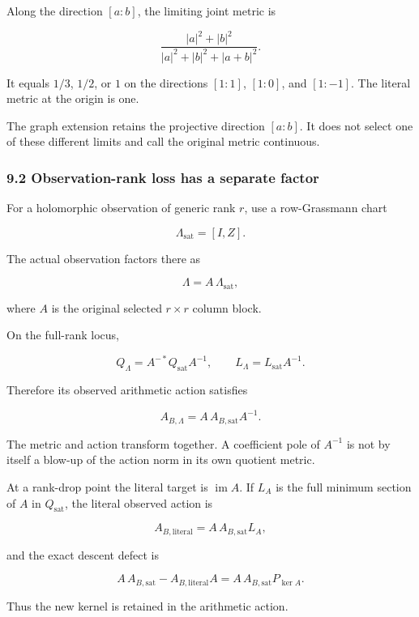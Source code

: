 \documentclass[11pt]{article}
\begin{document}
Along the direction \([a:b]\), the limiting joint metric is

\[
\boxed{
\frac{|a|^2+|b|^2}
{|a|^2+|b|^2+|a+b|^2}.
}
\tag{76}
\]

It equals \(1/3\), \(1/2\), or \(1\) on the directions \([1:1]\), \([1:0]\), and \([1:-1]\). The literal metric at the origin is one.

The graph extension retains the projective direction \([a:b]\). It does not select one of these different limits and call the original metric continuous.

\subsubsection{9.2 Observation-rank loss has a separate factor}\label{observation-rank-loss-has-a-separate-factor}

For a holomorphic observation of generic rank \(r\), use a row-Grassmann chart

\[
\Lambda_{\mathrm{sat}}=[I,Z].
\]

The actual observation factors there as

\[
\boxed{
\Lambda=A\,\Lambda_{\mathrm{sat}},
}
\tag{77}
\]

where \(A\) is the original selected \(r\times r\) column block.

On the full-rank locus,

\[
\boxed{
Q_\Lambda=A^{-*}Q_{\mathrm{sat}}A^{-1},
\qquad
L_\Lambda=L_{\mathrm{sat}}A^{-1}.
}
\tag{78}
\]

Therefore its observed arithmetic action satisfies

\[
\boxed{
A_{B,\Lambda}
=
A\,A_{B,\mathrm{sat}}A^{-1}.
}
\tag{79}
\]

The metric and action transform together. A coefficient pole of \(A^{-1}\) is not by itself a blow-up of the action norm in its own quotient metric.

At a rank-drop point the literal target is \(\operatorname{im}A\). If \(L_A\) is the full minimum section of \(A\) in \(Q_{\mathrm{sat}}\), the literal observed action is

\[
A_{B,\mathrm{literal}}
=
A\,A_{B,\mathrm{sat}}L_A,
\]

and the exact descent defect is

\[
\boxed{
A\,A_{B,\mathrm{sat}}
-A_{B,\mathrm{literal}}A
=
A\,A_{B,\mathrm{sat}}P_{\ker A}.
}
\tag{80}
\]

Thus the new kernel is retained in the arithmetic action.
\end{document}

